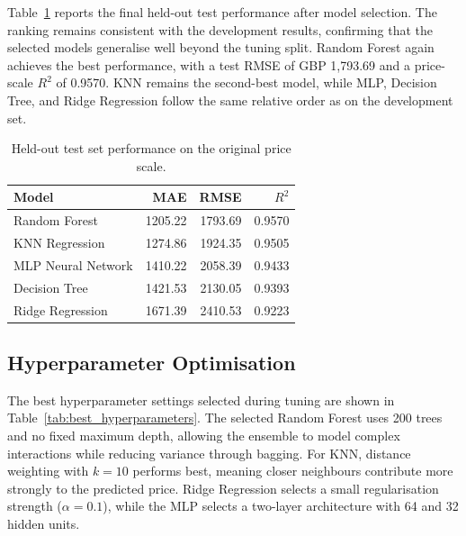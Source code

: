 Table~\ref{tab:test_model_comparison} reports the final held-out test performance after model selection. The ranking remains consistent with the development results, confirming that the selected models generalise well beyond the tuning split. Random Forest again achieves the best performance, with a test RMSE of GBP 1,793.69 and a price-scale $R^2$ of 0.9570. KNN remains the second-best model, while MLP, Decision Tree, and Ridge Regression follow the same relative order as on the development set.

\begin{table}[h]
\centering
\small
\setlength{\tabcolsep}{3pt}
\begin{tabular}{@{}lrrr@{}}
\toprule
\textbf{Model} & \textbf{MAE} & \textbf{RMSE} & \textbf{$R^2$} \\
\midrule
Random Forest      & 1205.22 & 1793.69 & 0.9570 \\
KNN Regression     & 1274.86 & 1924.35 & 0.9505 \\
MLP Neural Network & 1410.22 & 2058.39 & 0.9433 \\
Decision Tree      & 1421.53 & 2130.05 & 0.9393 \\
Ridge Regression   & 1671.39 & 2410.53 & 0.9223 \\
\bottomrule
\end{tabular}
\caption{Held-out test set performance on the original price scale.}
\label{tab:test_model_comparison}
\end{table}

\subsection{Hyperparameter Optimisation}
\label{sec:hyperparameter_results}

The best hyperparameter settings selected during tuning are shown in Table~\ref{tab:best_hyperparameters}. The selected Random Forest uses 200 trees and no fixed maximum depth, allowing the ensemble to model complex interactions while reducing variance through bagging. For KNN, distance weighting with $k=10$ performs best, meaning closer neighbours contribute more strongly to the predicted price. Ridge Regression selects a small regularisation strength ($\alpha=0.1$), while the MLP selects a two-layer architecture with 64 and 32 hidden units.

